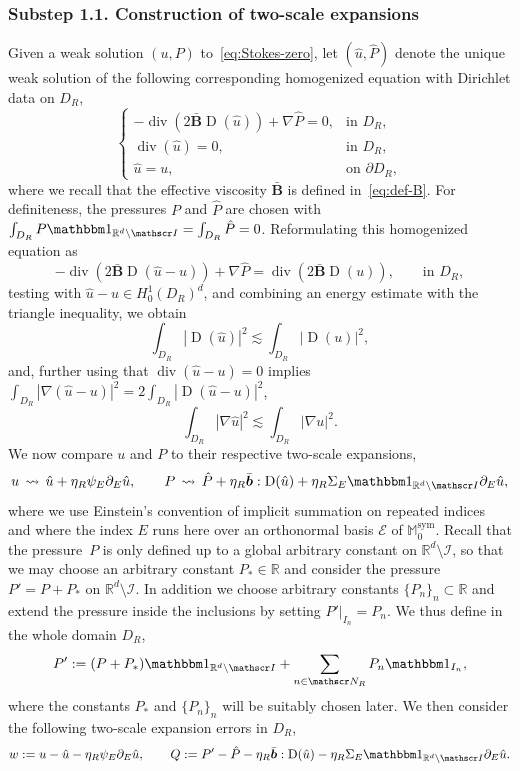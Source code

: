 \documentclass[JEP,XML,SOM,Unicode,published]{cedram}
\let\mathcal\mathscr
\let\mathds\mathbbm
\theoremstyle{plain}
\theoremstyle{definition}
\newcommand{\Ec}{\mathcal E}
\newcommand{\R}{\mathbb R}
\newcommand{\Ic}{\mathcal I}
\newcommand{\Md}{\mathbb M}
\newcommand{\Nc}{\mathcal N}
\newcommand{\D}{\operatorname{D}}
\newcommand{\bb}{\bar{\boldsymbol b}}
\newcommand{\Bb}{\bar{\boldsymbol B}}
\newcommand{\Div}{{\operatorname{div}}}
\newcommand{\Sym}{{\operatorname{sym}}}
\newcommand{\substep}[1]{\subsubsection*{Substep #1}}
\begin{document}
\substep{1.1. Construction of two-scale expansions}
Given a weak solution $(u,P)$ to~\eqref{eq:Stokes-zero},
let $(\hat u,\hat P)$ denote the unique weak solution of the following corresponding homogenized equation with Dirichlet data on $D_R$,
\begin{equation}\label{e.p1.4}
\begin{cases}
-\Div(2\Bb \D( \hat u))+\nabla\hat P=0 ,&\text{in $D_R$},\\
\Div(\hat u)=0,&\text{in $D_R$},\\
\hat u=u,&\text{on $\partial D_R$},
\end{cases}
\end{equation}
where we recall that the effective viscosity $\Bb$ is defined in~\eqref{eq:def-B}.
For definiteness, the pressures $P$ and $\hat P$ are chosen with $\int_{D_R} P\mathds1_{\R^d\setminus\Ic}=\int_{D_R}\hat P=0$.
Reformulating this homogenized equation as
\[-\Div(2\Bb \D( \hat u-u))+\nabla\hat P=\Div(2\Bb \D(u)),\qquad\text{in $D_R$},\]
testing with $\hat u-u\in H^1_0(D_R)^d$, and combining an energy estimate with the triangle inequality, we obtain
\begin{equation*}
\int_{D_R} |\!\D( \hat u)|^2 \lesssim \int_{D_R}|\!\D( u)|^2,
\end{equation*}
and, further using that $\Div(\hat u-u)=0$ implies $\int_{D_R}|\nabla(\hat u-u)|^2=2\int_{D_R}|\!\D(\hat u-u)|^2$,
\begin{equation}\label{e.p1.12+}
\int_{D_R} |\nabla\hat u|^2 \lesssim \int_{D_R}|\nabla u|^2.
\end{equation}
We now compare $u$ and $P$ to their respective two-scale expansions,
\[u\,\leadsto\,\hat u + \eta_R \psi_E \partial_E \hat u,\qquad P\,\leadsto\,\hat P+\eta_R\bb:\D(\hat u)+\eta_R \Sigma_E\mathds1_{\R^d\setminus\Ic} \partial_E \hat u,\]
where we use Einstein's convention of implicit summation on repeated indices and where the index $E$ runs here over an orthonormal basis $\Ec$ of $\Md_0^\Sym$.
Recall that the pressure~$P$ is only defined up to a global arbitrary constant on ${\R^d\setminus\Ic}$,
so that we may choose an arbitrary constant $P_*\in\R$ and consider the pressure $P'=P+P_*$ on ${\R^d\setminus\Ic}$.
In addition we choose arbitrary constants $\{P_n\}_n\subset\R$ and extend the pressure inside the inclusions by setting $P'|_{I_n}=P_n$. We thus define in the whole domain $D_R$,
\begin{equation}\label{eq:cst-press}
P':=(P+P_*)\mathds1_{{\R^d\setminus\Ic}}+\sum_{n\in\Nc_R}P_n \mathds 1_{I_n},
\end{equation}
where the constants $P_*$ and $\{P_n\}_n$ will be suitably chosen later.
We then consider the following two-scale expansion errors in $D_R$,
\begin{equation}\label{eq:def-wQ}
w:=u-\hat u - \eta_R \psi_E \partial_E \hat u,\qquad
Q:=P'-\hat P-\eta_R\bb:\D(\hat u)-\eta_R \Sigma_E\mathds1_{\R^d\setminus\Ic} \partial_E \hat u.
\end{equation}
\end{document}
